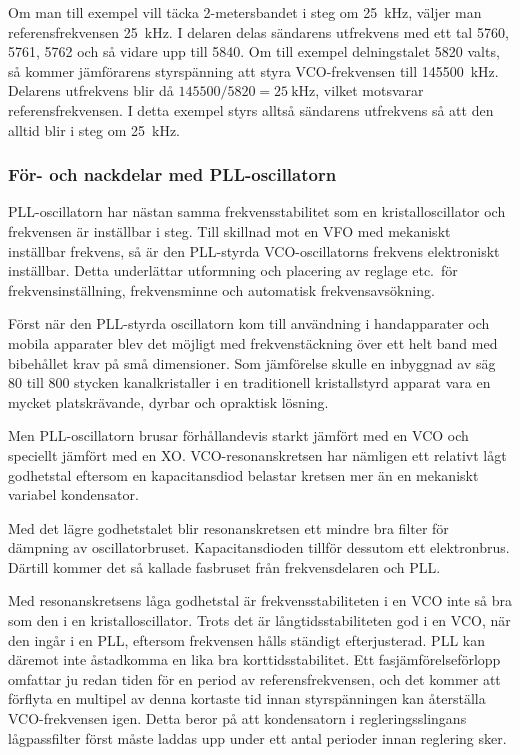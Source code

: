 Om man till exempel vill täcka 2-metersbandet i steg om \qty{25}{\kilo\hertz},
väljer man referensfrekvensen \qty{25}{\kilo\hertz}.
I delaren delas sändarens utfrekvens med ett tal 5760, 5761, 5762 och så vidare
upp till 5840.
Om till exempel delningstalet 5820 valts, så kommer jämförarens styrspänning att
styra VCO-frekvensen till \qty{145500}{\kilo\hertz}.
Delarens utfrekvens blir då \(145500/5820 = \qty{25}{\kilo\hertz}\), vilket
motsvarar referensfrekvensen.
I detta exempel styrs alltså sändarens utfrekvens så att den alltid blir i steg
om \qty{25}{\kilo\hertz}.

\subsubsection{För- och nackdelar med PLL-oscillatorn}

PLL-oscillatorn har nästan samma frekvensstabilitet som en
kristalloscillator och frekvensen är inställbar i steg.
Till skillnad mot en VFO med mekaniskt inställbar frekvens, så är den PLL-styrda
VCO-oscillatorns frekvens elektroniskt inställbar.
Detta underlättar utformning och placering av reglage etc.\ för
frekvensinställning, frekvensminne och automatisk frekvensavsökning.

Först när den PLL-styrda oscillatorn kom till användning i handapparater och
mobila apparater blev det möjligt med frekvenstäckning över ett helt band med
bibehållet krav på små dimensioner.
Som jämförelse skulle en inbyggnad av säg 80 till 800 stycken kanalkristaller
i en traditionell kristallstyrd apparat vara en mycket platskrävande, dyrbar
och opraktisk lösning.

Men PLL-oscillatorn brusar förhållandevis starkt jämfört med en VCO och
speciellt jämfört med en XO.
VCO-resonanskretsen har nämligen ett relativt lågt godhetstal eftersom en
kapacitansdiod belastar kretsen mer än en mekaniskt variabel kondensator.

Med det lägre godhetstalet blir resonanskretsen ett mindre bra
filter för dämpning av oscillatorbruset.
Kapacitansdioden tillför dessutom ett elektronbrus.
Därtill kommer det så kallade fasbruset från frekvensdelaren och PLL.

Med resonanskretsens låga godhetstal är frekvensstabiliteten i en VCO inte så
bra som den i en kristalloscillator.
Trots det är långtidsstabiliteten god i en VCO, när den ingår i en PLL,
eftersom frekvensen hålls ständigt efterjusterad.
PLL kan däremot inte åstadkomma en lika bra korttidsstabilitet.
Ett fasjämförelseförlopp omfattar ju redan tiden för en period av
referensfrekvensen, och det kommer att förflyta en multipel av denna kortaste
tid innan styrspänningen kan återställa VCO-frekvensen igen.
Detta beror på att kondensatorn i regleringsslingans lågpassfilter först måste
laddas upp under ett antal perioder innan reglering sker.

